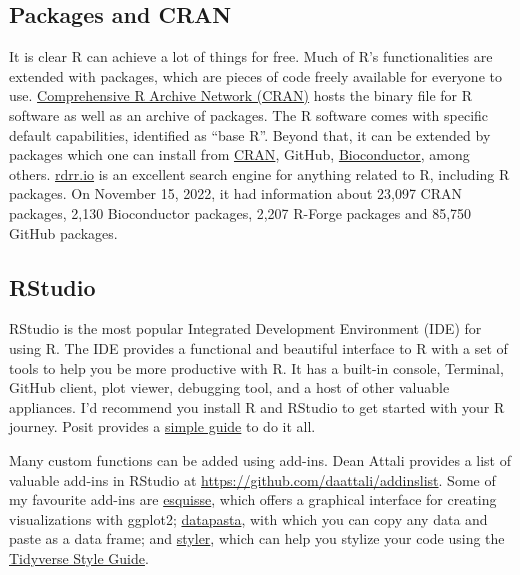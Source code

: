 \documentclass[
  letterpaper,
  DIV=11,
  numbers=noendperiod]{scrartcl}
\begin{document}
\hypertarget{packages-and-cran}{%
\subsection{Packages and CRAN}\label{packages-and-cran}}

It is clear R can achieve a lot of things for free. Much of R's
functionalities are extended with packages, which are pieces of code
freely available for everyone to use.
\href{https://cran.r-project.org/index.html}{Comprehensive R Archive
Network (CRAN)} hosts the binary file for R software as well as an
archive of packages. The R software comes with specific default
capabilities, identified as ``base R''. Beyond that, it can be extended
by packages which one can install from
\href{https://cran.r-project.org/web/packages/available_packages_by_name.html}{CRAN},
GitHub, \href{https://www.bioconductor.org/}{Bioconductor}, among
others. \href{https://rdrr.io/}{rdrr.io} is an excellent search engine
for anything related to R, including R packages. On November 15, 2022,
it had information about 23,097 CRAN packages, 2,130 Bioconductor
packages, 2,207 R-Forge packages and 85,750 GitHub packages.

\hypertarget{rstudio}{%
\subsection{RStudio}\label{rstudio}}

RStudio is the most popular Integrated Development Environment (IDE) for
using R. The IDE provides a functional and beautiful interface to R with
a set of tools to help you be more productive with R. It has a built-in
console, Terminal, GitHub client, plot viewer, debugging tool, and a
host of other valuable appliances. I'd recommend you install R and
RStudio to get started with your R journey. Posit provides a
\href{https://posit.co/download/rstudio-desktop/}{simple guide} to do it
all.

Many custom functions can be added using add-ins. Dean Attali provides a
list of valuable add-ins in RStudio at
\url{https://github.com/daattali/addinslist}. Some of my favourite
add-ins are \href{https://github.com/dreamRs/esquisse}{esquisse}, which
offers a graphical interface for creating visualizations with ggplot2;
\href{https://github.com/MilesMcBain/datapasta}{datapasta}, with which
you can copy any data and paste as a data frame; and
\href{https://github.com/r-lib/styler}{styler}, which can help you
stylize your code using the
\href{https://style.tidyverse.org/}{Tidyverse Style Guide}.
\end{document}
